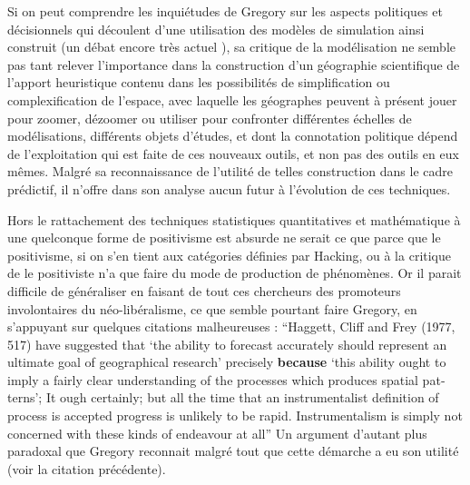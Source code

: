 Si on peut comprendre les inquiétudes de Gregory \textcite{Gregory1978} sur les aspects politiques et décisionnels qui découlent d'une utilisation des modèles de simulation ainsi construit (un débat encore très actuel \autocite{OSullivan2004} ), sa critique de la modélisation ne semble pas tant relever l'importance dans la construction d'un géographie scientifique de l'apport heuristique contenu dans les possibilités de simplification ou complexification de l'espace, avec laquelle les géographes peuvent à présent jouer pour zoomer, dézoomer ou utiliser pour confronter différentes échelles de modélisations, différents objets d'études, et dont la connotation politique dépend de l'exploitation qui est faite de ces nouveaux outils, et non pas des outils en eux mêmes. Malgré sa reconnaissance de l'utilité de telles construction dans le cadre prédictif, il n'offre dans son analyse aucun futur à l'évolution de ces techniques.

Hors le rattachement des techniques statistiques quantitatives et mathématique à une quelconque forme de positivisme est absurde ne serait ce que parce que le positivisme, si on s'en tient aux catégories définies par Hacking, ou à la critique de \autocite{Dauphine2003} le positiviste n'a que faire du mode de production de phénomènes. Or il parait difficile de généraliser en faisant de tout ces chercheurs des promoteurs involontaires du néo-libéralisme, ce que semble pourtant faire Gregory, en s'appuyant sur quelques citations malheureuses : \foreignquote{english}{Haggett, Cliff and Frey (1977, 517) have suggested that \foreignquote{english}{the ability to forecast accurately should represent an ultimate goal of geographical research} precisely \textbf{because} \foreignquote{english}{this ability ought to imply a fairly clear understanding of the processes which produces spatial patterns}; It ough certainly; but all the time that an instrumentalist definition of process is accepted progress is unlikely to be rapid. Instrumentalism is simply not concerned with these kinds of endeavour at all} \autocite[41]{Gregory1978} Un argument d'autant plus paradoxal que Gregory reconnait malgré tout que cette démarche a eu son utilité (voir la citation précédente).

